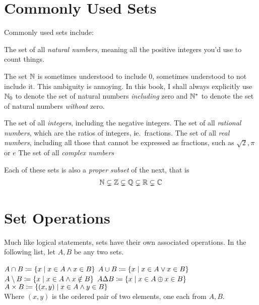 \section{Commonly Used Sets}
Commonly used sets include:
\begin{itemize}
  \ii{\(\NN\):} The set of all \emph{natural numbers}, meaning all the positive integers
        you'd use to count things.
\begin{remark}
  The set \(\NN\) is sometimes understood to include \(0\), sometimes understood
  to not include it. This ambiguity is annoying.
  In this book, I shall always explicitly use \(\mathbb{N}_{0}\) to denote the set of
  natural numbers \emph{including} zero and \(\mathbb{N}^{*}\) to denote the set of
  natural numbers \emph{without} zero.
\end{remark}
  \ii{\(\ZZ\):} The set of all \emph{integers}, including the negative integers.
  \ii{\(\QQ\)} The set of all \emph{rational numbers}, which are the ratios of integers,
        ie.\ fractions.
  \ii{\(\RR\):} The set of all \emph{real numbers}, including all those that cannot be
        expressed as fractions, such as \(\sqrt{2}, \pi\) or \(e\)
  \ii{\(\CC\)} The set of all \emph{complex numbers}
\end{itemize}

Each of these sets is also a \emph{proper subset} of the next, that is
\begin{align*}
  \mathbb{N} \subsetneq \mathbb{Z} \subsetneq \mathbb{Q} \subsetneq \mathbb{R} \subsetneq \mathbb{C}
\end{align*}

\section{Set Operations}
Much like logical statements, sets have their own associated operations.
In the following list, let \(A, B\) be any two sets.
\begin{itemize}
        \(A \cap B \coloneqq \{x \mid x \in A \land x \in B\}\)
        \(A \cup B \coloneqq \{x \mid x \in A \lor x \in B\}\)
        \(A \setminus B \coloneqq \{x \mid x \in A \land x \notin B\}\)
        \(A \Delta B \coloneqq \{x \mid x \in A \oplus x \in B\}\)
        \(A \times B \coloneqq \{(x, y) \mid x \in A \land y \in B\}\)\\
        Where \((x,y)\) is the ordered pair of two elements, one each from \(A, B\).
\end{itemize}

